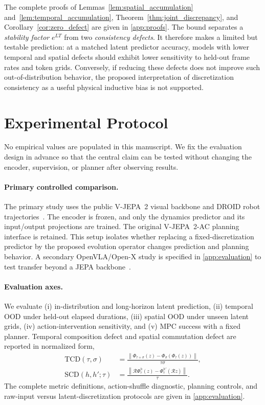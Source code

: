 \documentclass{article}
\theoremstyle{plain}
\theoremstyle{definition}
\theoremstyle{remark}
\newcommand{\PhiOp}{\Phi}
\newcommand{\Restr}{\mathcal{R}}
\newcommand{\norm}[1]{\left\lVert #1 \right\rVert}
\begin{document}
The complete proofs of Lemmas~\ref{lem:spatial_accumulation} and~\ref{lem:temporal_accumulation}, Theorem~\ref{thm:joint_discrepancy}, and Corollary~\ref{cor:zero_defect} are given in \cref{app:proofs}. The bound separates a \emph{stability factor} $e^{LT}$ from two \emph{consistency defects}. It therefore makes a limited but testable prediction: at a matched latent predictor accuracy, models with lower temporal and spatial defects should exhibit lower sensitivity to held-out frame rates and token grids. Conversely, if reducing these defects does not improve such out-of-distribution behavior, the proposed interpretation of discretization consistency as a useful physical inductive bias is not supported.

\section{Experimental Protocol}
\label{sec:experiments}

No empirical values are populated in this manuscript. We fix the evaluation design in advance so that the central claim can be tested without changing the encoder, supervision, or planner after observing results.

\paragraph{Primary controlled comparison.}
The primary study uses the public V-JEPA~2 visual backbone and DROID robot trajectories~\citep{assran2025vjepa2,khazatsky2024droid}. The encoder is frozen, and only the dynamics predictor and its input/output projections are trained. The original V-JEPA~2-AC planning interface is retained. This setup isolates whether replacing a fixed-discretization predictor by the proposed evolution operator changes prediction and planning behavior. A secondary OpenVLA/Open-X study is specified in \cref{app:evaluation} to test transfer beyond a JEPA backbone~\citep{kim2024openvla,oneill2023openx}.

\paragraph{Evaluation axes.}
We evaluate (i) in-distribution and long-horizon latent prediction, (ii) temporal OOD under held-out elapsed durations, (iii) spatial OOD under unseen latent grids, (iv) action-intervention sensitivity, and (v) MPC success with a fixed planner. Temporal composition defect and spatial commutation defect are reported in normalized form,
\begin{align}
\mathrm{TCD}(\tau,\sigma)
&=\frac{\norm{\PhiOp_{\tau+\sigma}(z)-\PhiOp_{\sigma}(\PhiOp_{\tau}(z))}}{\tau\sigma},
\\
\mathrm{SCD}(h,h';\tau)
&=\frac{\norm{\Restr\PhiOp^{h}_{\tau}(z)-\PhiOp^{h'}_{\tau}(\Restr z)}}{\tau}.
\end{align}
The complete metric definitions, action-shuffle diagnostic, planning controls, and raw-input versus latent-discretization protocols are given in \cref{app:evaluation}.
\end{document}
